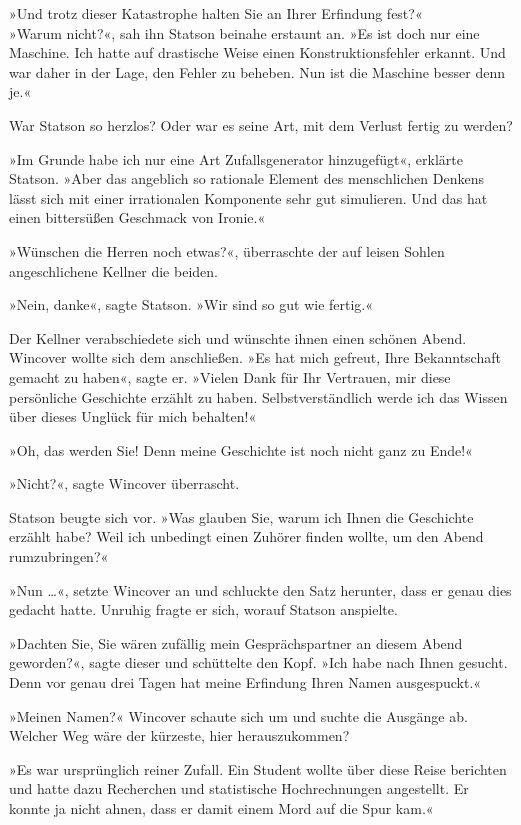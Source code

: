 »Und trotz dieser Katastrophe halten Sie an Ihrer Erfindung
fest?«\\ »Warum nicht?«, sah ihn Statson beinahe erstaunt an. »Es
ist doch nur eine Maschine. Ich hatte auf drastische Weise einen
Konstruktionsfehler erkannt. Und war daher in der Lage, den Fehler
zu beheben. Nun ist die Maschine besser denn je.«

War Statson so herzlos? Oder war es seine Art, mit dem Verlust
fertig zu werden?

»Im Grunde habe ich nur eine Art Zufallsgenerator hinzugefügt«,
erklärte Statson. »Aber das angeblich so rationale Element des
menschlichen Denkens lässt sich mit einer irrationalen Komponente
sehr gut simulieren. Und das hat einen bittersüßen Geschmack von
Ironie.«

»Wünschen die Herren noch etwas?«, überraschte der auf leisen
Sohlen angeschlichene Kellner die beiden.

»Nein, danke«, sagte Statson. »Wir sind so gut wie fertig.«

Der Kellner verabschiedete sich und wünschte ihnen einen schönen
Abend. Wincover wollte sich dem anschließen. »Es hat mich gefreut,
Ihre Bekanntschaft gemacht zu haben«, sagte er. »Vielen Dank für
Ihr Vertrauen, mir diese persönliche Geschichte erzählt zu haben.
Selbstverständlich werde ich das Wissen über dieses Unglück für
mich behalten!«

»Oh, das werden Sie! Denn meine Geschichte ist noch nicht ganz zu
Ende!«

»Nicht?«, sagte Wincover überrascht.

Statson beugte sich vor. »Was glauben Sie, warum ich Ihnen die
Geschichte erzählt habe? Weil ich unbedingt einen Zuhörer finden
wollte, um den Abend rumzubringen?«

»Nun \ldots{}«, setzte Wincover an und schluckte den Satz herunter, dass
er genau dies gedacht hatte. Unruhig fragte er sich, worauf Statson
anspielte.

»Dachten Sie, Sie wären zufällig mein Gesprächspartner an diesem
Abend geworden?«, sagte dieser und schüttelte den Kopf. »Ich habe
nach Ihnen gesucht. Denn vor genau drei Tagen hat meine Erfindung
Ihren Namen ausgespuckt.«

»Meinen Namen?« Wincover schaute sich um und suchte die Ausgänge
ab. Welcher Weg wäre der kürzeste, hier herauszukommen?

»Es war ursprünglich reiner Zufall. Ein Student wollte über diese
Reise berichten und hatte dazu Recherchen und statistische
Hochrechnungen angestellt. Er konnte ja nicht ahnen, dass er damit
einem Mord auf die Spur kam.«

